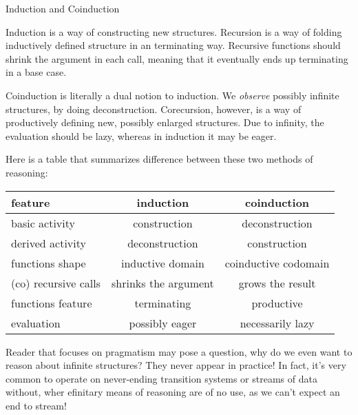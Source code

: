 \documentclass[declaration,shortabstract]{iithesis}
\theoremstyle{definition} \newtheorem{definition}{Definition}[chapter]
\theoremstyle{remark} \newtheorem{remark}[definition]{Observation}
\theoremstyle{plain} \newtheorem{theorem}[definition]{Theorem}
\theoremstyle{plain} \newtheorem{lemma}[definition]{Lemma}
\begin{document}
    Induction and Coinduction

    Induction is a way of constructing new structures. Recursion is a way of
    folding inductively defined structure in an terminating way. Recursive functions
    should shrink the argument in each call, meaning that it eventually ends up
    terminating in a base case.

    Coinduction is literally a dual notion to induction. We \textit{observe} possibly
    infinite structures, by doing deconstruction. Corecursion, however, is a way
    of productively defining new, possibly enlarged structures. Due to infinity,
    the evaluation should be lazy, whereas in induction it may be eager.

    Here is a table that summarizes difference between these two methods of reasoning:

    \begin{center}
    \begin{tabular}{lcc}
    \toprule

    \textbf{feature}             & \textbf{induction}            & \textbf{coinduction}          \\
    \midrule

    basic activity      & construction          & deconstruction \\
    \midrule

    derived activity    & deconstruction       & construction         \\
    \midrule

    functions shape     & inductive domain     & coinductive codomain \\
    \midrule

    (co) recursive calls& shrinks the argument & grows the result     \\
    \midrule

    functions feature   & terminating          & productive           \\
    \midrule

    evaluation          & possibly eager       & necessarily lazy     \\
    \bottomrule

    \end{tabular}
    \end{center}

    Reader that focuses on pragmatism may pose a question, why do we even want
    to reason about infinite structures? They never appear in practice! In fact,
    it's very common to operate on never-ending transition systems or streams of
    data without, wher efinitary means of reasoning are of no use, as we can’t
    expect an end to stream!
\end{document}
